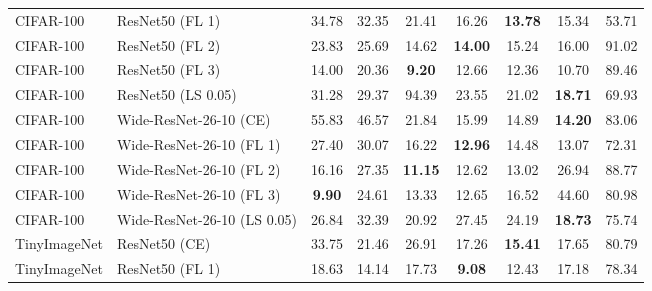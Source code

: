 \begin{table}[h!]
{\begin{tabular}{llccccccc}
   CIFAR-100 &             ResNet50 (FL 1) &                  34.78 &        32.35 &                  21.41 &                  16.26 & \textbf{13.78} &                  15.34 &                  53.71 \\
   CIFAR-100 &             ResNet50 (FL 2) &                  23.83 &        25.69 &                  14.62 & \textbf{14.00} &                  15.24 &                  16.00 &                  91.02 \\
   CIFAR-100 &             ResNet50 (FL 3) &                  14.00 &        20.36 &  \textbf{9.20} &                  12.66 &                  12.36 &                  10.70 &                  89.46 \\
   CIFAR-100 &          ResNet50 (LS 0.05) &                  31.28 &        29.37 &                  94.39 &                  23.55 &                  21.02 & \textbf{18.71} &                  69.93 \\
   CIFAR-100 &      Wide-ResNet-26-10 (CE) &                  55.83 &        46.57 &                  21.84 &                  15.99 &                  14.89 & \textbf{14.20} &                  83.06 \\
   CIFAR-100 &    Wide-ResNet-26-10 (FL 1) &                  27.40 &        30.07 &                  16.22 & \textbf{12.96} &                  14.48 &                  13.07 &                  72.31 \\
   CIFAR-100 &    Wide-ResNet-26-10 (FL 2) &                  16.16 &        27.35 & \textbf{11.15} &                  12.62 &                  13.02 &                  26.94 &                  88.77 \\
   CIFAR-100 &    Wide-ResNet-26-10 (FL 3) &  \textbf{9.90} &        24.61 &                  13.33 &                  12.65 &                  16.52 &                  44.60 &                  80.98 \\
   CIFAR-100 & Wide-ResNet-26-10 (LS 0.05) &                  26.84 &        32.39 &                  20.92 &                  27.45 &                  24.19 & \textbf{18.73} &                  75.74 \\
TinyImageNet &               ResNet50 (CE) &                  33.75 &        21.46 &                  26.91 &                  17.26 & \textbf{15.41} &                  17.65 &                  80.79 \\
TinyImageNet &             ResNet50 (FL 1) &                  18.63 &        14.14 &                  17.73 &  \textbf{9.08} &                  12.43 &                  17.18 &                  78.34 \\

\end{tabular}}
\end{table}
